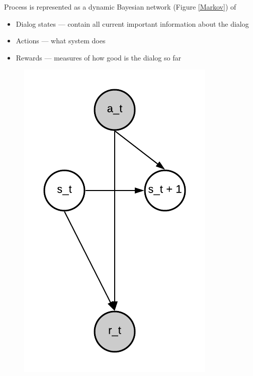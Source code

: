 \documentclass[12pt,titlepage,a4paper]{article}
\begin{document}
Process is represented as a dynamic Bayesian network (Figure \ref{Markov}) of 
\begin{itemize}
    \item Dialog states --- contain all current important information about the dialog
    \item Actions --- what system does
    \item Rewards --- measures of how good is the dialog so far
\end{itemize}

\begin{figure}[!htb]
      \includegraphics[width=\linewidth]{markov.png}

\end{figure}
\end{document}
